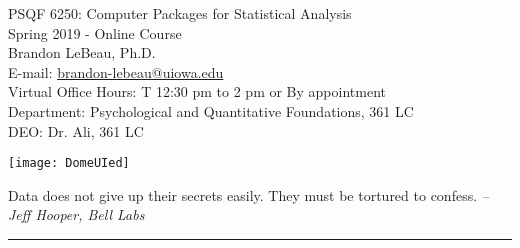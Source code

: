 \documentclass[11pt,article,oneside]{memoir}
\newenvironment{myquote}{\list{}{\leftmargin=1.25in\rightmargin=0.5in}\item[]}{\endlist}
\begin{document}
\setsansfont[Mapping=tex-text]{Myriad Pro} 
\setmonofont[Mapping=tex-text,Scale=0.8]{Pragmata} 

\def\ind{\hangindent=1 true cm\hangafter=1 \noindent}
\def\labelitemi{$\cdot$}


  

\begin{minipage}[b]{.7\linewidth}
\begin{flushleft}
{\huge PSQF 6250: Computer Packages for Statistical Analysis} \\[.1in]
{\large\sffamily Spring 2019 - Online Course} \\
\vspace*{.25in}
{\large Brandon LeBeau, Ph.D.} \\[.05in]
{\normalsize E-mail: \href{mailto:brandon-lebeau@uiowa.edu}{brandon-lebeau@uiowa.edu} \\Virtual Office Hours: T 12:30 pm to 2 pm or By appointment 
   \\ Department: Psychological and Quantitative Foundations, 361 LC \\ DEO: Dr. Ali, 361 LC}
\end{flushleft}
\end{minipage}
\begin{minipage}[t]{.3\linewidth}
\texttt{[image: DomeUIed]}
\end{minipage}

\vspace{.25in}


\begin{myquote}
Data does not give up their secrets easily. They must be tortured to confess. \hfill \emph{-- Jeff Hooper, Bell Labs} \\
\rule{\linewidth}{.4pt}
\end{myquote}
\end{document}
